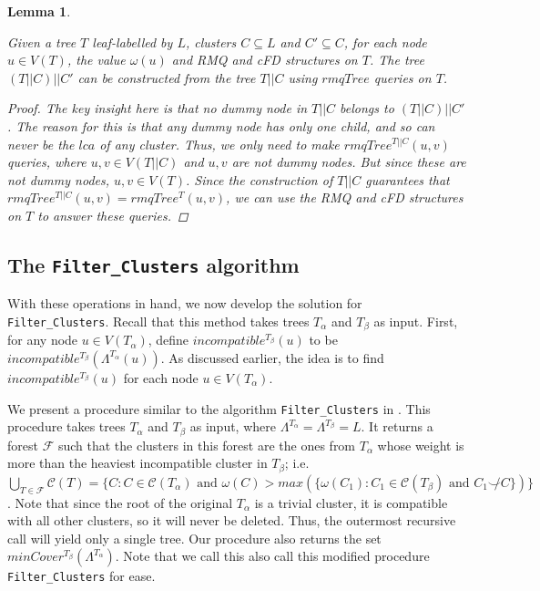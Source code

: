 \documentclass{article}
\newcommand{\compatible}{\smile}
\newcommand{\leafset}{\Lambda}
\newcommand{\weight}{\omega}
\newcommand{\TA}{T_\alpha}
\newcommand{\TB}{T_\beta}
\newtheorem{restrictedrmq}[incompatibility]{Lemma}
\begin{document}
    \begin{restrictedrmq}
        \label{lem:restrictedrmq}

        Given a tree $T$ leaf-labelled by $L$, clusters $C \subseteq L$ and $C' \subseteq C$, for each node $u \in V(T)$, the value $\weight(u)$ and RMQ and cFD structures on $T$. The tree $(T||C)||C'$ can be constructed from the tree $T||C$ using $rmqTree$ queries on $T$.

        \begin{proof}
            The key insight here is that no dummy node in $T||C$ belongs to $(T||C)||C'$. The reason for this is that any dummy node has only one child, and so can never be the $lca$ of any cluster. Thus, we only need to make $rmqTree^{T||C}(u, v)$ queries, where $u, v \in V(T||C)$ and $u, v$ are not dummy nodes. But since these are not dummy nodes, $u, v \in V(T)$. Since the construction of $T||C$ guarantees that $rmqTree^{T||C}(u, v) = rmqTree^{T}(u, v)$, we can use the RMQ and cFD structures on $T$ to answer these queries.
        \end{proof}
    \end{restrictedrmq}

    \subsection{The \texttt{Filter\_Clusters} algorithm}
    \label{subsec:filterclusters}

    With these operations in hand, we now develop the solution for \texttt{Filter\_Clusters}. Recall that this method takes trees $\TA$ and $\TB$ as input. First, for any node $u \in V(\TA)$, define $incompatible^{\TB}(u)$ to be $incompatible^{\TB}(\leafset^{\TA}(u))$. As discussed earlier, the idea is to find $incompatible^{\TB}(u)$ for each node $u \in V(\TA)$.

    We present a procedure similar to the algorithm \texttt{Filter\_Clusters} in \cite{jansson2018algorithms}. This procedure takes trees $\TA$ and $\TB$ as input, where $\leafset^{\TA} = \leafset^{\TB} = L$. It returns a forest $\mathcal{F}$ such that the clusters in this forest are the ones from $\TA$ whose weight is more than the heaviest incompatible cluster in $\TB$; i.e. $\bigcup_{T \in \mathcal{F}} \mathcal{C}(T) = \{C : C \in \mathcal{C}(\TA) \text{ and } \weight(C) > max(\{\weight(C_1) : C_1 \in \mathcal{C}(\TB) \text{ and } C_1 \not\compatible C\})\}$. Note that since the root of the original $\TA$ is a trivial cluster, it is compatible with all other clusters, so it will never be deleted. Thus, the outermost recursive call will yield only a single tree. Our procedure also returns the set $minCover^{\TB}(\leafset^{\TA})$. Note that we call this also call this modified procedure \texttt{Filter\_Clusters} for ease.
\end{document}
